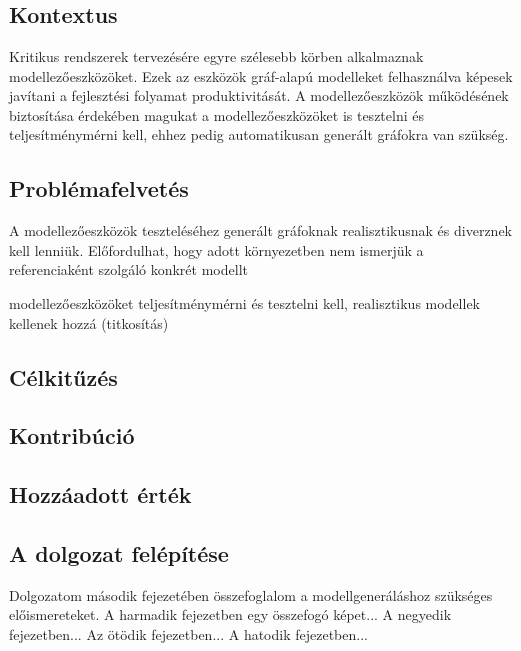 \chapter{\bevezetes}

\section{Kontextus}
Kritikus rendszerek tervezésére egyre szélesebb körben alkalmaznak modellezőeszközöket.
Ezek az eszközök gráf-alapú modelleket felhasználva képesek javítani a fejlesztési folyamat produktivitását.
A modellezőeszközök működésének biztosítása érdekében magukat a modellezőeszközöket is tesztelni és teljesítménymérni kell, ehhez pedig automatikusan generált gráfokra van szükség.


\section{Problémafelvetés}
A modellezőeszközök teszteléséhez generált gráfoknak realisztikusnak és diverznek kell lenniük.
Előfordulhat, hogy adott környezetben nem ismerjük a referenciaként szolgáló konkrét modellt


modellezőeszközöket teljesítménymérni és tesztelni kell,
realisztikus modellek kellenek hozzá (titkosítás)

\section{Célkitűzés}

\section{Kontribúció}

\section{Hozzáadott érték}

\section{A dolgozat felépítése}
Dolgozatom második fejezetében összefoglalom a modellgeneráláshoz 
 szükséges előismereteket.
A harmadik fejezetben egy összefogó képet...
A negyedik fejezetben...
Az ötödik fejezetben...
A hatodik fejezetben...




